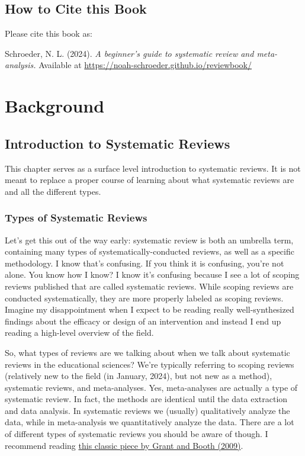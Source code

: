 \documentclass[
]{book}
\begin{document}
\hypertarget{how-to-cite-this-book}{%
\chapter*{How to Cite this Book}\label{how-to-cite-this-book}}

Please cite this book as:

Schroeder, N. L. (2024). \emph{A beginner's guide to systematic review and meta-analysis.} Available at \url{https://noah-schroeder.github.io/reviewbook/}

\hypertarget{part-background}{%
\part{Background}\label{part-background}}

\hypertarget{introduction-to-systematic-reviews}{%
\chapter{Introduction to Systematic Reviews}\label{introduction-to-systematic-reviews}}

This chapter serves as a surface level introduction to systematic reviews. It is not meant to replace a proper course of learning about what systematic reviews are and all the different types.

\hypertarget{types-of-systematic-reviews}{%
\section{Types of Systematic Reviews}\label{types-of-systematic-reviews}}

Let's get this out of the way early: systematic review is both an umbrella term, containing many types of systematically-conducted reviews, as well as a specific methodology. I know that's confusing. If you think it is confusing, you're not alone. You know how I know? I know it's confusing because I see a lot of scoping reviews published that are called systematic reviews. While scoping reviews are conducted systematically, they are more properly labeled as scoping reviews. Imagine my disappointment when I expect to be reading really well-synthesized findings about the efficacy or design of an intervention and instead I end up reading a high-level overview of the field.

So, what types of reviews are we talking about when we talk about systematic reviews in the educational sciences? We're typically referring to scoping reviews (relatively new to the field (in January, 2024), but not new as a method), systematic reviews, and meta-analyses. Yes, meta-analyses are actually a type of systematic review. In fact, the methods are identical until the data extraction and data analysis. In systematic reviews we (usually) qualitatively analyze the data, while in meta-analysis we quantitatively analyze the data. There are a lot of different types of systematic reviews you should be aware of though. I recommend reading \href{https://onlinelibrary.wiley.com/doi/full/10.1111/j.1471-1842.2009.00848.x}{this classic piece by Grant and Booth (2009)}\citep{grant2009}.
\end{document}
